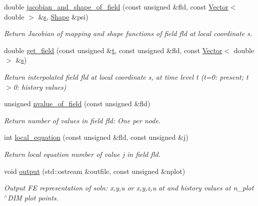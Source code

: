 \begin{DoxyCompactItemize}
double \hyperlink{classoomph_1_1ProjectableUnsteadyHeatElement_a49318b95add2b1ac8c6f0f0cfac195f6}{jacobian\+\_\+and\+\_\+shape\+\_\+of\+\_\+field} (const unsigned \&fld, const \hyperlink{classoomph_1_1Vector}{Vector}$<$ double $>$ \&\hyperlink{cfortran_8h_ab7123126e4885ef647dd9c6e3807a21c}{s}, \hyperlink{classoomph_1_1Shape}{Shape} \&psi)
\begin{DoxyCompactList}\small\item\em Return Jacobian of mapping and shape functions of field fld at local coordinate s. \end{DoxyCompactList}\item 
double \hyperlink{classoomph_1_1ProjectableUnsteadyHeatElement_ae4b0cb13a1849f7e950252164884eeba}{get\+\_\+field} (const unsigned \&\hyperlink{cfortran_8h_af6f0bd3dc13317f895c91323c25c2b8f}{t}, const unsigned \&fld, const \hyperlink{classoomph_1_1Vector}{Vector}$<$ double $>$ \&\hyperlink{cfortran_8h_ab7123126e4885ef647dd9c6e3807a21c}{s})
\begin{DoxyCompactList}\small\item\em Return interpolated field fld at local coordinate s, at time level t (t=0\+: present; t$>$0\+: history values) \end{DoxyCompactList}\item 
unsigned \hyperlink{classoomph_1_1ProjectableUnsteadyHeatElement_aa15defb47cb015dc9c589606addfdd61}{nvalue\+\_\+of\+\_\+field} (const unsigned \&fld)
\begin{DoxyCompactList}\small\item\em Return number of values in field fld\+: One per node. \end{DoxyCompactList}\item 
int \hyperlink{classoomph_1_1ProjectableUnsteadyHeatElement_ad3c589c0bd97ac402919e426e5ee0e6b}{local\+\_\+equation} (const unsigned \&fld, const unsigned \&j)
\begin{DoxyCompactList}\small\item\em Return local equation number of value j in field fld. \end{DoxyCompactList}\item 
void \hyperlink{classoomph_1_1ProjectableUnsteadyHeatElement_a2509779b894af697108d2fa8f2cf1ea8}{output} (std\+::ostream \&outfile, const unsigned \&nplot)
\begin{DoxyCompactList}\small\item\em Output FE representation of soln\+: x,y,u or x,y,z,u at and history values at n\+\_\+plot$^\wedge$\+D\+IM plot points. \end{DoxyCompactList}\end{DoxyCompactItemize}
